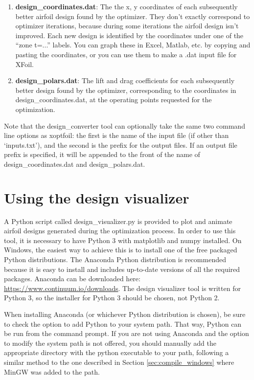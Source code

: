 \documentclass[11pt]{article}
\begin{document}
\begin{enumerate}
\item{\textbf{design\_coordinates.dat}: The the x, y
coordinates of each subsequently better airfoil design found by the optimizer. They don't
exactly correspond to optimizer iterations, because during some iterations the airfoil
design isn't improved. Each new design is identified by the coordinates under one of the
``zone t=...'' labels.  You can graph these in Excel, Matlab, etc. by copying and pasting
the coordinates, or you can use them to make a .dat input file for XFoil.}
\item{\textbf{design\_polars.dat}: The lift and drag coefficients for each subsequently 
better design found by the optimizer, corresponding to the coordinates in 
design\_coordinates.dat, at the operating points requested for the optimization.}
\end{enumerate}

Note that the design\_converter tool can optionally take the same two command line options
as xoptfoil: the first is the name of the input file (if other than `inputs.txt'), and the
second is the prefix for the output files.  If an output file prefix is specified, it will
be appended to the front of the name of design\_coordinates.dat and design\_polars.dat.

\section{Using the design visualizer}

A Python script called design\_visualizer.py is provided to plot and animate airfoil
designs generated during the optimization process.  In order to use this tool, it is
necessary to have Python 3 with matplotlib and numpy installed.  On Windows, the easiest
way to achieve this is to install one of the free packaged Python distributions.  The
Anaconda Python distribution is recommended because it is easy to install and includes
up-to-date versions of all the required packages.  Anaconda can be downloaded here:
\url{https://www.continuum.io/downloads}.  The design visualizer tool is written for
Python 3, so the installer for Python 3 should be chosen, not Python 2. 

When installing Anaconda (or whichever Python distribution is chosen), be sure to check
the option to add Python to your system path.  That way, Python can be run from the
command prompt.  If you are not using Anaconda and the option to modify the system path is
not offered, you should manually add the appropriate directory with the python executable
to your path, following a similar method to the one described in Section
\ref{sec:compile_windows} where MinGW was added to the path.
\end{document}
